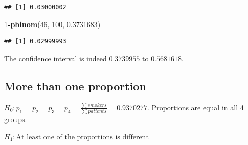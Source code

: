 \documentclass[
]{book}
\newenvironment{Shaded}{\begin{snugshade}}{\end{snugshade}}
\newcommand{\DecValTok}[1]{\textcolor[rgb]{0.00,0.00,0.81}{#1}}
\newcommand{\FloatTok}[1]{\textcolor[rgb]{0.00,0.00,0.81}{#1}}
\newcommand{\FunctionTok}[1]{\textcolor[rgb]{0.13,0.29,0.53}{\textbf{#1}}}
\newcommand{\NormalTok}[1]{#1}
\newcommand{\SpecialCharTok}[1]{\textcolor[rgb]{0.81,0.36,0.00}{\textbf{#1}}}
\begin{document}
\begin{itemize}
\begin{verbatim}
## [1] 0.03000002
\end{verbatim}

\begin{Shaded}
\begin{Highlighting}[]
\DecValTok{1}\SpecialCharTok{{-}}\FunctionTok{pbinom}\NormalTok{(}\DecValTok{46}\NormalTok{, }\DecValTok{100}\NormalTok{, }\FloatTok{0.3731683}\NormalTok{)}
\end{Highlighting}
\end{Shaded}

\begin{verbatim}
## [1] 0.02999993
\end{verbatim}

  The confidence interval is indeed \(0.3739955\) to \(0.5681618\).
\end{itemize}

\subsection{More than one proportion}\label{proportions_test_more_samples}

\(H_0: p_1 = p_2 = p_3 = p_4 = \frac{\sum smokers}{\sum patients} = 0.9370277\). Proportions are equal in all 4 groups.

\(H_1: \text{At least one of the proportions is different}\)
\end{document}
